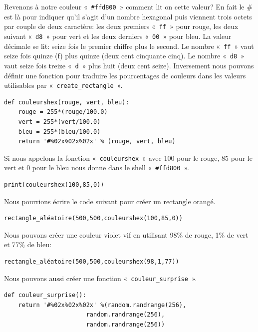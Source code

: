 Revenons à notre couleur « \texttt{\#ffd800} » comment lit on cette valeur? En fait le \# est là pour indiquer qu'il s'agit d'un nombre hexagonal puis viennent trois octets par couple de deux caractère: les deux premiers « \texttt{ff} » pour rouge, les deux suivant « \texttt{d8} » pour vert et les deux derniers « \texttt{00} » pour bleu. La valeur décimale se lit: seize fois le premier chiffre plus le second. Le nombre « \texttt{ff} » vaut seize fois quinze (f) plus quinze (deux cent cinquante cinq). Le nombre « \texttt{d8} » vaut seize fois treize  « \texttt{d} » plus huit (deux cent seize). Inversement nous pouvons définir une fonction pour traduire les pourcentages de couleurs dans les valeurs utilisables par « \texttt{create\_rectangle} ».

\begin{Verbatim}[frame=single,rulecolor=\color{mbleu}, label=à taper]
def couleurshex(rouge, vert, bleu):
    rouge = 255*(rouge/100.0)
    vert = 255*(vert/100.0)
    bleu = 255*(bleu/100.0)
    return '#%02x%02x%02x' % (rouge, vert, bleu)
\end{Verbatim}

Si nous appelons la fonction « \texttt{couleurshex} » avec 100 pour le rouge, 85 pour le vert et 0 pour le bleu nous donne dans le shell « \texttt{\#ffd800} ».

\begin{Verbatim}[frame=single,rulecolor=\color{mbleu}, label=à taper]
print(couleurshex(100,85,0))
\end{Verbatim}

Nous pourrions écrire le code suivant pour créer un rectangle orangé.

\begin{Verbatim}[frame=single,rulecolor=\color{gray}, label=exemple]
rectangle_aléatoire(500,500,couleurshex(100,85,0))
\end{Verbatim}

Nous pouvons créer une couleur violet vif  en utilisant 98\% de rouge, 1\% de vert et 77\% de bleu:
\begin{Verbatim}[frame=single,rulecolor=\color{gray}, label=exemple]
rectangle_aléatoire(500,500,couleurshex(98,1,77))
\end{Verbatim}

Nous pouvons aussi créer une fonction « \texttt{couleur\_surprise} ».
\begin{Verbatim}[frame=single,rulecolor=\color{mbleu}, label=à taper]
def couleur_surprise():
    return '#%02x%02x%02x' %(random.randrange(256),
                       random.randrange(256),
                       random.randrange(256))
\end{Verbatim}
 
